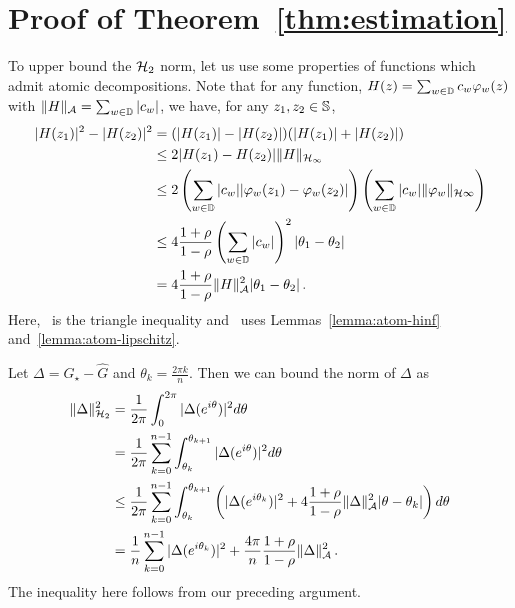 \section{Proof of Theorem~\ref{thm:estimation}} 
To upper bound the $\mathcal{H}_2$ norm, let us use some properties of functions which admit atomic decompositions.  Note that for any function, $H(z) = \sum_{w \in \mathbb{D}} c_w \varphi_w(z)$ with $\|H\|_{\mathcal{A}}=\sum_{w\in\mathbb{D}} |c_w|$, we have, for any $z_1,z_2\in\mathbb{S}$,
\begin{subequations}
\begin{align}
\nonumber	|H(z_1)|^2-|H(z_2)|^2 &= 
	(|H(z_1)|-|H(z_2)|)(|H(z_1)|+|H(z_2)|) \\
\nonumber	&\leq 2 |H(z_1)-H(z_2)| \|H\|_{\mathcal{H}_{\infty}} \\
\label{eq:tri-ineq2}	&\leq 2 \left( \sum_{w \in \mathbb{D}} |c_w| |\varphi_w(z_1)-\varphi_w(z_2)|\right) \left(\sum_{w\in \mathbb{D}} |c_w| \|\varphi_w\|_{\mathcal{H}{\infty}}\right)\\
\label{eq:applylemmas}	&\leq 4 \frac{1+\rho}{1-\rho}  \left( \sum_{w \in \mathbb{D}} |c_w|\right)^2 |\theta_1-\theta_2|\\
\nonumber	 &= 4 \frac{1+\rho}{1-\rho}  \|H\|_{\mathcal{A}}^2 |\theta_1-\theta_2|\,.
\end{align}
\end{subequations}
Here,~ is the triangle inequality and~ uses Lemmas~\ref{lemma:atom-hinf} and~\ref{lemma:atom-lipschitz}.

Let $\Delta = G_\star-\hat{G}$ and $\theta_k= \frac{2 \pi k}{n}$.  Then we can bound the norm of $\Delta$ as
\begin{align*}
\|\Delta\|_{\mathcal{H}_2}^2 &= \frac{1}{2\pi} \int_0^{2\pi} |\Delta(e^{i\theta})|^2 d\theta\\
&= \frac{1}{2\pi} \sum_{k=0}^{n-1} \int_{\theta_k}^{\theta_{k+1}} |\Delta(e^{i\theta})|^2 d\theta\\
&\leq \frac{1}{2\pi} \sum_{k=0}^{n-1} \int_{\theta_k}^{\theta_{k+1}} \left(|\Delta(e^{i\theta_k})|^2 + 4 \frac{1+\rho}{1-\rho} \|\Delta\|_{\mathcal{A}}^2 |\theta-\theta_k| \right)d\theta\\
&= \frac{1}{n}\sum_{k=0}^{n-1} |\Delta(e^{i\theta_k})|^2 + \frac{4\pi}{n} \frac{1+\rho}{1-\rho} \|\Delta\|_{\mathcal{A}}^2\,.
\end{align*}
The inequality here follows from our preceding argument. 

